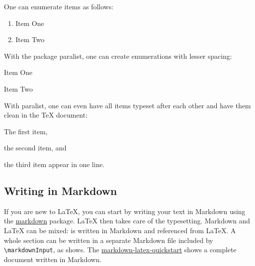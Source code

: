 One can enumerate items as follows:

\begin{ltgexample}
\begin{enumerate}
  \item Item One
  \item Item Two
\end{enumerate}
\end{ltgexample}

With the package paralist, one can create enumerations with lesser spacing:

\begin{ltgexample}
\begin{compactenum}
  \item Item One
  \item Item Two
\end{compactenum}
\end{ltgexample}

With paralist, one can even have all items typeset after each other and have them clean in the TeX document:

\begin{ltgexample}
\begin{inparaenum}
  \item The first item,
  \item the second item, and
  \item the third item appear in one line.
\end{inparaenum}
\end{ltgexample}

\subsection{Writing in Markdown}\label{sec:markdown}

\ifluatex
  If you are new to \LaTeX{}, you can start by writing your text in Markdown using the \href{https://ctan.org/pkg/markdown}{markdown} package.
  \LaTeX{} then takes care of the typesetting.
  Markdown and \LaTeX{} can be mixed:
   is written in Markdown and referenced from \LaTeX{}.
  A whole section can be written in a separate Markdown file included by \verb|\markdownInput|, as  shows.
  The \href{https://github.com/latextemplates/markdown-latex-quickstart}{markdown-latex-quickstart} shows a complete document written in Markdown.


